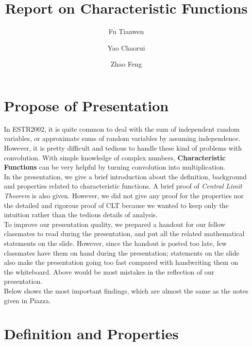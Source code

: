 \documentclass{article}
\title{Report on Characteristic Functions}
\author{Fu Tianwen \and Yao Chaorui \and Zhao Feng}
\theoremstyle{definition}
\theoremstyle{plain}
\theoremstyle{remark}
\begin{document}
\maketitle

\section{Propose of Presentation}
In ESTR2002, it is quite common to deal with the sum of independent random variables, or approximate sums of random variables by assuming independence. However, it is pretty difficult and tedious to handle these kind of problems with convolution. With simple knowledge of complex numbers, \textbf{Characteristic Functions} can be very helpful by turning convolution into multiplication.\\
In the presentation, we give a brief introduction about the definition, background and properties related to characteristic functions. A brief proof of \textit{Central Limit Theorem} is also given. However, we did not give any proof for the properties nor the detailed and rigorous proof of CLT because we wanted to keep only the intuition rather than the tedious details of analysis.\\
To improve our presentation quality, we prepared a handout for our fellow classmates to read during the presentation, and put all the related mathematical statements on the slide. However, since the handout is posted too late, few classmates have them on hand during the presentation; statements on the slide also make the presentation going too fast compared with handwriting them on the whiteboard. Above would be most mistakes in the reflection of our presentation.\\
Below shows the most important findings, which are almost the same as the notes given in Piazza.
\section{Definition and Properties}


\medskip



\end{document}
